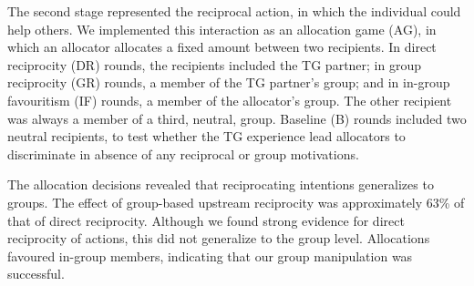 \documentclass[12pt,a4paper]{article}
\begin{document}
The second stage represented the reciprocal action, in which the individual could help others. We implemented this interaction as an allocation game (AG), in which an allocator allocates a fixed amount between two recipients. In direct reciprocity (DR) rounds, the recipients included the TG partner; in group reciprocity (GR) rounds, a member of the TG partner's group; and in in-group favouritism (IF) rounds, a member of the allocator's group. The other recipient was always a member of a third, neutral, group. Baseline (B) rounds included two neutral recipients, to test whether the TG experience lead allocators to discriminate in absence of any reciprocal or group motivations.

The allocation decisions revealed that reciprocating intentions generalizes to groups. The effect of group-based upstream reciprocity was approximately 63\% of that of direct reciprocity. Although we found strong evidence for direct reciprocity of actions, this did not generalize to the group level. Allocations favoured in-group members, indicating that our group manipulation was successful.
\end{document}
